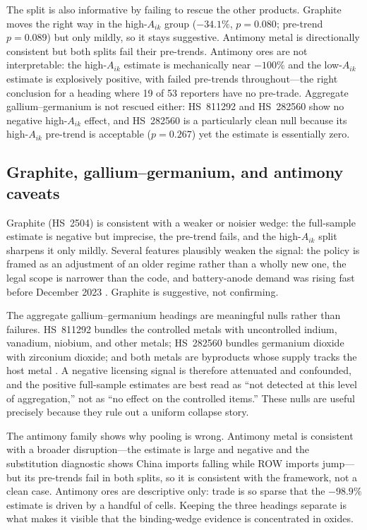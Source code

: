 \documentclass[12pt,a4paper]{article}
\begin{document}


The split is also informative by failing to rescue the other products. Graphite
moves the right way in the high-$A_{ik}$ group ($-34.1\%$, $p=0.080$; pre-trend
$p=0.089$) but only mildly, so it stays suggestive. Antimony metal is
directionally consistent but both splits fail their pre-trends. Antimony ores are
not interpretable: the high-$A_{ik}$ estimate is mechanically near $-100\%$ and
the low-$A_{ik}$ estimate is explosively positive, with failed pre-trends
throughout---the right conclusion for a heading where 19 of 53 reporters have no
pre-trade. Aggregate gallium--germanium is not rescued either: HS~811292 and
HS~282560 show no negative high-$A_{ik}$ effect, and HS~282560 is a particularly
clean null because its high-$A_{ik}$ pre-trend is acceptable ($p=0.267$) yet the
estimate is essentially zero.
\subsection{Graphite, gallium--germanium, and antimony caveats}\label{sec:caveats}

Graphite (HS~2504) is consistent with a weaker or noisier wedge: the full-sample
estimate is negative but imprecise, the pre-trend fails, and the high-$A_{ik}$
split sharpens it only mildly. Several features plausibly weaken the signal: the
policy is framed as an adjustment of an older regime rather than a wholly new
one, the legal scope is narrower than the code, and battery-anode demand was
rising fast before December 2023 \citep{park2025graphite_supply_chain,
usgs_2026_graphite_natural}. Graphite is suggestive, not confirming.

The aggregate gallium--germanium headings are meaningful nulls rather than
failures. HS~811292 bundles the controlled metals with uncontrolled indium,
vanadium, niobium, and other metals; HS~282560 bundles germanium dioxide with zirconium
dioxide; and both metals are byproducts whose supply tracks the host metal
\citep{frenzel2017byproduct_metals, usgs_2026_gallium, usgs_2026_germanium}. A
negative licensing signal is therefore attenuated and confounded, and the
positive full-sample estimates are best read as ``not detected at this level of
aggregation,'' not as ``no effect on the controlled items.'' These nulls are
useful precisely because they rule out a uniform collapse story.

The antimony family shows why pooling is wrong. Antimony metal is consistent with
a broader disruption---the estimate is large and negative and the substitution
diagnostic shows China imports falling while ROW imports jump---but its
pre-trends fail in both splits, so it is consistent with the framework, not a
clean case.
Antimony ores are descriptive only: trade is so sparse that the $-98.9\%$
estimate is driven by a handful of cells. Keeping the three headings separate is
what makes it visible that the binding-wedge evidence is concentrated in oxides.
\end{document}
